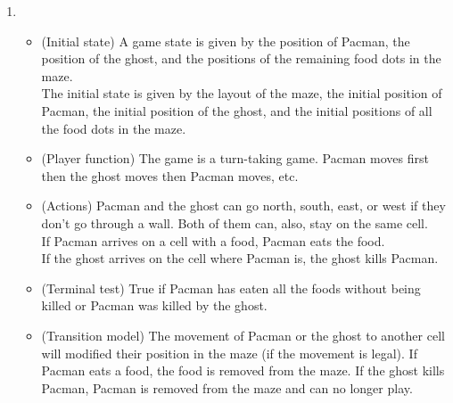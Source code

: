 \documentclass{article}
\begin{document}
\begin{enumerate}[label=\alph*.,leftmargin=*]
    \item
    	\begin{itemize}
    		\item (Initial state) A game state is given by the position of Pacman, the position of the ghost, and the positions of the remaining food dots in the maze.\\
    		The initial state is given by the layout of the maze, the initial position of Pacman, the initial position of the ghost, and the initial positions of all the food dots in the maze.
    		
    		\item (Player function) The game is a turn-taking game. Pacman moves first then the ghost moves then Pacman moves, etc.
    		
    		\item (Actions) Pacman and the ghost can go north, south, east, or west if they don't go through a wall. Both of them can, also, stay on the same cell.\\
    		If Pacman arrives on a cell with a food, Pacman eats the food.\\
    		If the ghost arrives on the cell where Pacman is, the ghost kills Pacman.
    		
    		\item (Terminal test) True if Pacman has eaten all the foods without being killed or Pacman was killed by the ghost.
    		
    		\item (Transition model) The movement of Pacman or the ghost to another cell will modified their position in the maze (if the movement is legal). If Pacman eats a food, the food is removed from the maze. If the ghost kills Pacman, Pacman is removed from the maze and can no longer play.
    		
			

\end{itemize}
\end{enumerate}
\end{document}
